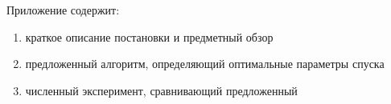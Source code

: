 Приложение содержит: \begin{enumerate}
    \item краткое описание постановки и предметный обзор
    \item предложенный алгоритм, определяющий оптимальные параметры спуска  
    \item численный эксперимент, сравнивающий предложенный 
\end{enumerate} 
